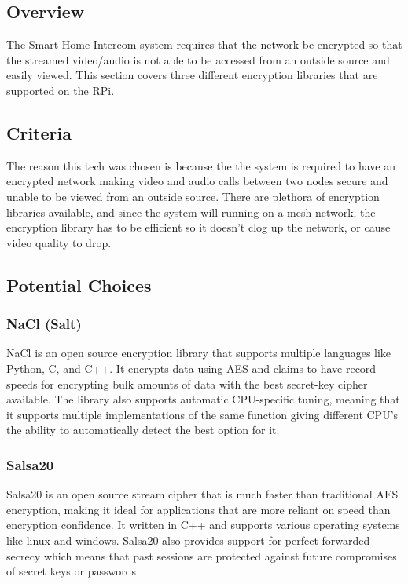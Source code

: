 \documentclass[onecolumn, draftclsnofoot,10pt, compsoc]{IEEEtran}
\begin{document}
\subsection{Overview}
 The Smart Home Intercom system requires that the network be encrypted so that the streamed video/audio is not able to be accessed from an outside source and easily viewed. 
 This section covers three different encryption libraries that are supported on the RPi.

\subsection{Criteria}
 The reason this tech was chosen is because the the system is required to have an encrypted network making video and audio calls between two nodes secure and unable to be viewed from an outside source. There are plethora of encryption libraries available, and since the system will running on a mesh network, the encryption library has to be efficient so it doesn't clog up the network, or cause video quality to drop.

\subsection{Potential Choices}
\subsubsection{NaCl (Salt)}
NaCl is an open source encryption library that supports multiple languages like Python, C, and C++. It encrypts data using AES and claims to have record speeds for encrypting bulk amounts of data with the best secret-key cipher available. The library also supports automatic CPU-specific tuning, meaning that it supports multiple implementations of the same function giving different CPU's the ability to automatically detect the best option for it.



\subsubsection{Salsa20}
Salsa20 is an open source stream cipher that is much faster than traditional AES encryption, making it ideal for applications that are more reliant on speed than encryption confidence. It written in C++ and supports various operating systems like linux and windows. Salsa20 also provides support for perfect forwarded secrecy which means that past sessions are protected against future compromises of secret keys or passwords  
\end{document}

